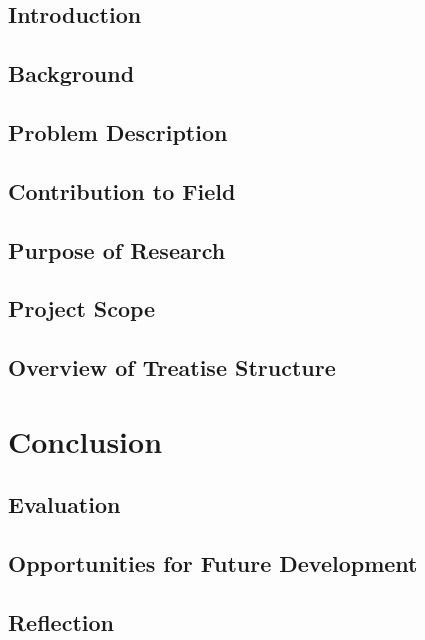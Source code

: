 	\section{Introduction}
	
	\section{Background}
	
	\section{Problem Description}
	
	\section{Contribution to Field}
	
	\section{Purpose of Research}
	
	\section{Project Scope}
	
	\section{Overview of Treatise Structure}
	
\chapter{Conclusion}
	\section{Evaluation}
	
	\section{Opportunities for Future Development}
	
	\section{Reflection}

\bibliographysection


